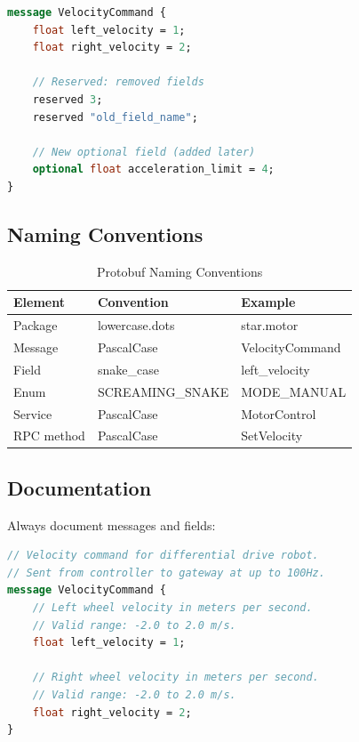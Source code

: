 \documentclass[11pt,letterpaper]{article}
\begin{document}
\begin{lstlisting}[language=Protobuf, caption=Schema Evolution Example]
message VelocityCommand {
    float left_velocity = 1;
    float right_velocity = 2;

    // Reserved: removed fields
    reserved 3;
    reserved "old_field_name";

    // New optional field (added later)
    optional float acceleration_limit = 4;
}
\end{lstlisting}

\subsection{Naming Conventions}

\begin{table}[H]
\centering
\begin{tabular}{|l|l|l|}
\hline
\textbf{Element} & \textbf{Convention} & \textbf{Example} \\
\hline
Package & lowercase.dots & star.motor \\
Message & PascalCase & VelocityCommand \\
Field & snake\_case & left\_velocity \\
Enum & SCREAMING\_SNAKE & MODE\_MANUAL \\
Service & PascalCase & MotorControl \\
RPC method & PascalCase & SetVelocity \\
\hline
\end{tabular}
\caption{Protobuf Naming Conventions}
\end{table}

\subsection{Documentation}

Always document messages and fields:

\begin{lstlisting}[language=Protobuf]
// Velocity command for differential drive robot.
// Sent from controller to gateway at up to 100Hz.
message VelocityCommand {
    // Left wheel velocity in meters per second.
    // Valid range: -2.0 to 2.0 m/s.
    float left_velocity = 1;

    // Right wheel velocity in meters per second.
    // Valid range: -2.0 to 2.0 m/s.
    float right_velocity = 2;
}
\end{lstlisting}

\end{document}
